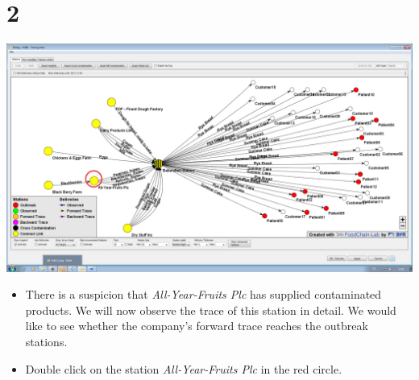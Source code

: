 \documentclass[10pt]{beamer}
\begin{document}
\section{2}
\begin{frame}
	\begin{center}
  		\includegraphics[height=0.6\textheight]{2.png}
	\end{center}
	\begin{itemize}
		\item There is a suspicion that \textit{All-Year-Fruits Plc} has supplied contaminated products. We will now observe the trace of this station in detail. We would like to see whether the company’s forward trace reaches the outbreak stations.
		\item Double click on the station \textit{All-Year-Fruits Plc} in the red circle.
	\end{itemize}
\end{frame}
\end{document}
